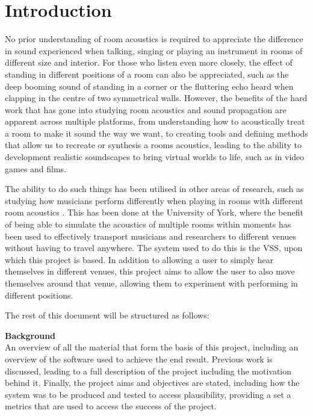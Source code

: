 \documentclass[../../main.tex]{subfiles}
\begin{document}
\section{Introduction}

	No prior understanding of room acoustics is required to appreciate the difference in sound experienced when talking, singing or playing an instrument in rooms of different size and interior. For those who listen even more closely, the effect of standing in different positions of a room can also be appreciated, such as the deep booming sound of standing in a corner or the fluttering echo heard when clapping in the centre of two symmetrical walls. However, the benefits of the hard work that has gone into studying room acoustics and sound propagation are apparent across multiple platforms, from understanding how to acoustically treat a room to make it sound the way we want, to creating tools and defining methods that allow us to recreate or synthesis a rooms acoustics, leading to the ability to development realistic soundscapes to bring virtual worlds to life, such as in video games and films.

	The ability to do such things has been utilised in other areas of research, such as studying how musicians perform differently when playing in rooms with different room acoustics \cite{Brereton2014}. This has been done at the University of York, where the benefit of being able to simulate the acoustics of multiple rooms within moments has been used to effectively transport musicians and researchers to different venues without having to travel anywhere. The system used to do this is the \ac{VSS}, upon which this project is based. In addition to allowing a user to simply hear themselves in different venues, this project aims to allow the user to also move themselves around that venue, allowing them to experiment with performing in different positions.

	The rest of this document will be structured as follows:

	\textbf{Background}\\
		An overview of all the material that form the basis of this project, including an overview of the software used to achieve the end result. Previous work is discussed, leading to a full description of the project including the motivation behind it. Finally, the project aims and objectives are stated, including how the system was to be produced and tested to access plausibility, providing a set a metrics that are used to access the success of the project.
\end{document}

